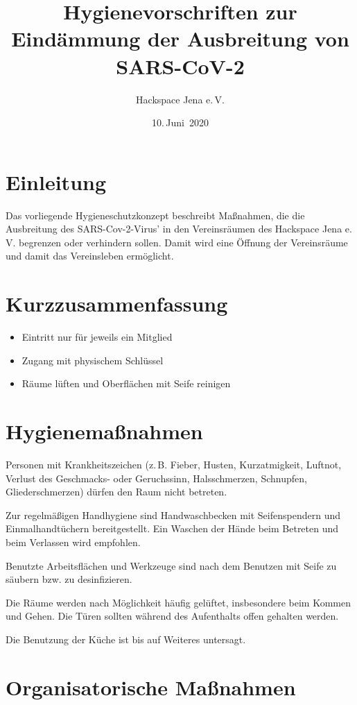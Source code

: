 \documentclass[a4paper,12pt,parskip=half]{scrartcl}
\title{Hygienevorschriften zur Eindämmung der Ausbreitung von SARS-CoV-2}
\author{Hackspace Jena e.\,V.}
\date{10.\,Juni~2020}
\begin{document}
\maketitle

\section*{Einleitung}

Das vorliegende Hygieneschutzkonzept beschreibt Maßnahmen, die die Ausbreitung des SARS-Cov-2-Virus' in den Vereinsräumen des Hackspace Jena e.\,V. begrenzen oder verhindern sollen. Damit wird eine Öffnung der Vereinsräume und damit das Vereinsleben ermöglicht.

\section*{Kurzzusammenfassung}
\begin{itemize}
\item Eintritt nur für jeweils ein Mitglied
\item Zugang mit physischem Schlüssel
\item Räume lüften und Oberflächen mit Seife reinigen
\end{itemize}

\section*{Hygienemaßnahmen}

Personen mit Krankheitszeichen (z.\,B. Fieber, Husten, Kurzatmigkeit, Luftnot, Verlust des
Geschmacks- oder Geruchssinn, Halsschmerzen, Schnupfen, Gliederschmerzen) dürfen den Raum nicht betreten.

Zur regelmäßigen Handhygiene sind Handwaschbecken mit Seifenspendern und
Einmalhandtüchern bereitgestellt. Ein Waschen der Hände beim Betreten und beim Verlassen wird empfohlen.

Benutzte Arbeitsflächen und Werkzeuge sind nach dem Benutzen mit Seife zu säubern bzw. zu desinfizieren.

Die Räume werden nach Möglichkeit häufig gelüftet, insbesondere beim Kommen und Gehen. Die Türen sollten während des Aufenthalts offen gehalten werden.

Die Benutzung der Küche ist bis auf Weiteres untersagt.

\section*{Organisatorische Maßnahmen}
\end{document}
